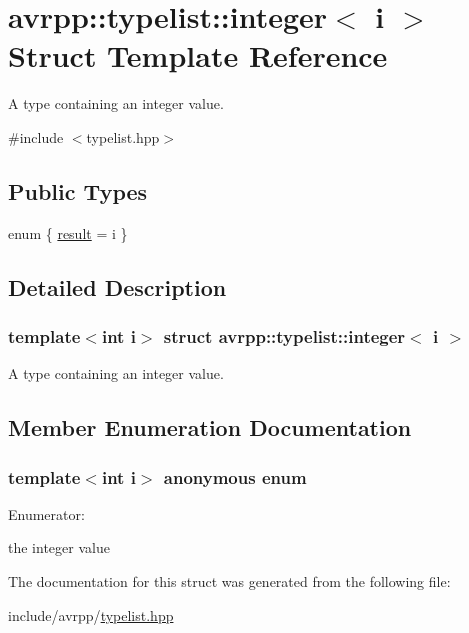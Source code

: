 \hypertarget{structavrpp_1_1typelist_1_1integer}{
\section{avrpp::typelist::integer$<$ i $>$ Struct Template Reference}
\label{structavrpp_1_1typelist_1_1integer}
}


A type containing an integer value.  




{\ttfamily \#include $<$typelist.hpp$>$}

\subsection*{Public Types}
\begin{DoxyCompactItemize}
\item 
enum \{ \hyperlink{structavrpp_1_1typelist_1_1integer_a64c42e7d981b01185e387f35b4efccc7a693c61056ba1a84eae66509fb337378f}{result} = i
 \}
\end{DoxyCompactItemize}


\subsection{Detailed Description}
\subsubsection*{template$<$int i$>$ struct avrpp::typelist::integer$<$ i $>$}

A type containing an integer value. 

\subsection{Member Enumeration Documentation}
\hypertarget{structavrpp_1_1typelist_1_1integer_a64c42e7d981b01185e387f35b4efccc7}{
\subsubsection[{"@27}]{\setlength{\rightskip}{0pt plus 5cm}template$<$int i$>$ anonymous enum}}
\label{structavrpp_1_1typelist_1_1integer_a64c42e7d981b01185e387f35b4efccc7}
\begin{Desc}
\item[Enumerator: ]\par
\begin{description}
\item[{\em 
\hypertarget{structavrpp_1_1typelist_1_1integer_a64c42e7d981b01185e387f35b4efccc7a693c61056ba1a84eae66509fb337378f}{
result}
\label{structavrpp_1_1typelist_1_1integer_a64c42e7d981b01185e387f35b4efccc7a693c61056ba1a84eae66509fb337378f}
}]the integer value \end{description}
\end{Desc}



The documentation for this struct was generated from the following file:\begin{DoxyCompactItemize}
\item 
include/avrpp/\hyperlink{typelist_8hpp}{typelist.hpp}\end{DoxyCompactItemize}
